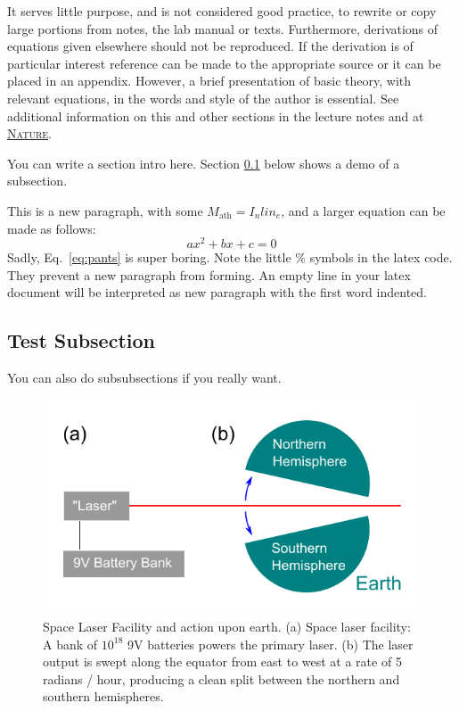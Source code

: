 \documentclass[12pt]{article}
\begin{document}
It serves little purpose, and is not considered good practice, to rewrite or copy large portions from notes, the lab manual or texts. Furthermore, derivations of equations given elsewhere should not be reproduced. If the derivation is of particular interest reference can be made to the appropriate source or it can be placed in an appendix. However, a brief presentation of basic theory, with relevant equations, in the words and style of the author is essential.  	
%
See additional information on this and other sections in the lecture notes and at \href{http://www.nature.com/scitable/ebooks/english-communication-for-scientists-14053993/contents}{\textsc{Nature}}.

You can write a section intro here. Section \ref{sec:sub} below shows a demo of a subsection.

This is a new paragraph, with some $M_\textrm{ath}=I_n lin_e$, and a larger equation can be made as follows:
%
\begin{equation}\label{eq:pants}
ax^2 + bx + c = 0
\end{equation}
%
Sadly, Eq.~\ref{eq:pants} is super boring. Note the little \% symbols in the latex code. They prevent a new paragraph from forming. An empty line in your latex document will be interpreted as new paragraph with the first word indented. 

\subsection{Test Subsection}\label{sec:sub}
You can also do subsubsections if you really want. 

\begin{figure}
	\includegraphics[scale=0.9]{Figures/Figure1}%
	\caption{Space Laser Facility and action upon earth. (a) Space laser facility: A bank of $10^{18}$ 9V batteries powers the primary laser. (b) The laser output is swept along the equator from east to west at a rate of 5 radians / hour, producing a clean split between the northern and southern hemispheres. }
	\label{fig:laser}
\end{figure}
\end{document}
